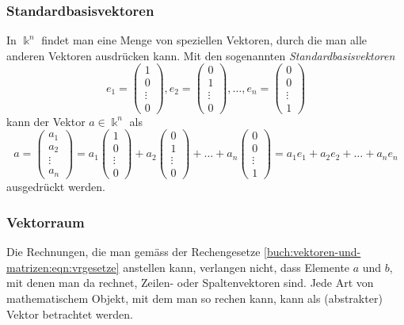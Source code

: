 \subsubsection{Standardbasisvektoren}
In $\Bbbk^n$ findet man eine Menge von speziellen Vektoren, durch die
man alle anderen Vektoren ausdrücken kann.
Mit den sogenannten {\em Standardbasisvektoren}
\[
e_1=\begin{pmatrix}1\\0\\\vdots\\0\end{pmatrix},
e_2=\begin{pmatrix}0\\1\\\vdots\\0\end{pmatrix},
\dots,
e_n=\begin{pmatrix}0\\0\\\vdots\\1\end{pmatrix}
\]
kann der Vektor $a\in\Bbbk^n$ als
\[
a
=
\begin{pmatrix}a_1\\a_2\\\vdots\\a_n\end{pmatrix}
=
a_1 \begin{pmatrix}1\\0\\\vdots\\0\end{pmatrix}
+
a_2 \begin{pmatrix}0\\1\\\vdots\\0\end{pmatrix}
+
\dots
+
a_n \begin{pmatrix}0\\0\\\vdots\\1\end{pmatrix}
=
a_1e_1+a_2e_2+\dots+a_ne_n
\]
ausgedrückt werden.

\subsubsection{Vektorraum}
Die Rechnungen, die man gemäss der Rechengesetze
\eqref{buch:vektoren-und-matrizen:eqn:vrgesetze}
anstellen kann, verlangen nicht, dass Elemente $a$ und $b$, mit denen man
da rechnet, Zeilen- oder Spaltenvektoren sind.
Jede Art von mathematischem Objekt, mit dem man so rechen kann,
kann als (abstrakter) Vektor betrachtet werden.

